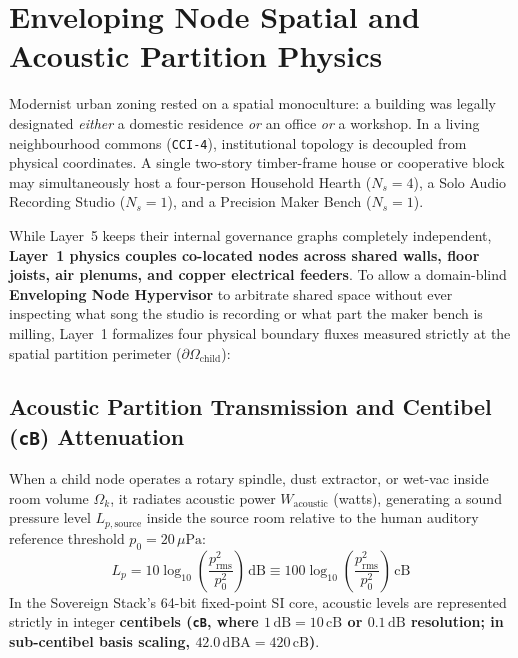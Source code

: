 \section{Enveloping Node Spatial and Acoustic Partition Physics}
\label{sec:l1_enveloping_partition_physics}

Modernist urban zoning rested on a spatial monoculture: a building was legally designated \textit{either} a domestic residence \textit{or} an office \textit{or} a workshop. In a living neighbourhood commons (\texttt{CCI-4}), institutional topology is decoupled from physical coordinates. A single two-story timber-frame house or cooperative block may simultaneously host a four-person Household Hearth ($N_s = 4$), a Solo Audio Recording Studio ($N_s = 1$), and a Precision Maker Bench ($N_s = 1$).

While Layer~5 keeps their internal governance graphs completely independent, \textbf{Layer~1 physics couples co-located nodes across shared walls, floor joists, air plenums, and copper electrical feeders}. To allow a domain-blind \textbf{Enveloping Node Hypervisor} to arbitrate shared space without ever inspecting what song the studio is recording or what part the maker bench is milling, Layer~1 formalizes four physical boundary fluxes measured strictly at the spatial partition perimeter ($\partial \Omega_{\mathrm{child}}$):

\subsection{Acoustic Partition Transmission and Centibel (\texttt{cB}) Attenuation}

When a child node operates a rotary spindle, dust extractor, or wet-vac inside room volume $\Omega_k$, it radiates acoustic power $W_{\mathrm{acoustic}}$ (watts), generating a sound pressure level $L_{p,\mathrm{source}}$ inside the source room relative to the human auditory reference threshold $p_0 = 20\,\mu\mathrm{Pa}$:
\begin{equation}
L_p = 10 \log_{10}\left(\frac{p_{\mathrm{rms}}^2}{p_0^2}\right)\,\mathrm{dB} \equiv 100 \log_{10}\left(\frac{p_{\mathrm{rms}}^2}{p_0^2}\right)\,\mathrm{cB}
\label{eq:l1_centibel_def}
\end{equation}
In the Sovereign Stack's 64-bit fixed-point SI core, acoustic levels are represented strictly in integer \textbf{centibels (\texttt{cB}, where $1\,\mathrm{dB} = 10\,\mathrm{cB}$ or $0.1\,\mathrm{dB}$ resolution; in sub-centibel basis scaling, $42.0\,\mathrm{dBA} = 420\,\mathrm{cB}$)}.

